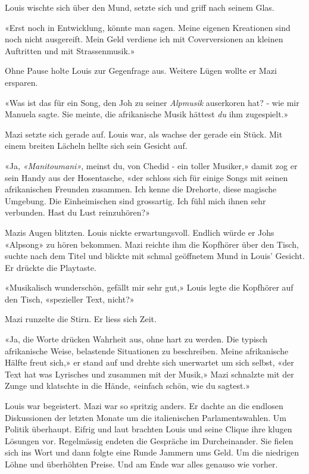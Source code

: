 Louis wischte sich über den Mund, setzte sich und griff nach seinem
Glas.

«Erst noch in Entwicklung, könnte man sagen. Meine eigenen Kreationen
sind noch nicht ausgereift. Mein Geld verdiene ich mit Coverversionen an
kleinen Auftritten und mit Strassenmusik.»

Ohne Pause holte Louis zur Gegenfrage aus. Weitere Lügen wollte er Mazi
ersparen.

«Was ist das für ein Song, den Joh zu seiner \emph{Alpmusik} auserkoren
hat? - wie mir Manuela sagte. Sie meinte, die afrikanische Musik hättest \emph{du} ihm
zugespielt.»

Mazi setzte sich gerade auf. Louis war, als wachse der gerade ein Stück.
Mit einem breiten Lächeln hellte sich sein Gesicht auf.

«Ja, \emph{«Manitoumani»}, meinst du, von Chedid - ein toller
Musiker,» damit zog er sein Handy aus der Hosentasche, «der schloss 
sich für einige Songs mit seinen afrikanischen Freunden zusammen. Ich
kenne die Drehorte, diese magische Umgebung. Die Einheimischen sind
grossartig. Ich fühl mich ihnen sehr verbunden. Hast du Lust
reinzuhören?»

Mazis Augen blitzten.
Louis nickte erwartungsvoll. Endlich würde er Johs «Alpsong» zu hören
bekommen.
Mazi reichte ihm die Kopfhörer über den Tisch, suchte nach dem Titel und
blickte mit schmal geöffnetem Mund in Louis’ Gesicht. Er drückte die
Playtaste.



«Musikalisch wunderschön, gefällt mir sehr gut,» Louis legte die
Kopfhörer auf den Tisch, «spezieller Text, nicht?»

Mazi runzelte die Stirn. Er liess sich
Zeit.

«Ja, die Worte drücken Wahrheit aus, ohne hart zu werden. Die typisch
afrikanische Weise, belastende Situationen zu beschreiben. Meine
afrikanische Hälfte freut sich,» er stand auf und drehte sich unerwartet
um sich selbst, «der Text hat was Lyrisches und zusammen mit der Musik,» Mazi
schnalzte mit der Zunge und klatschte in die Hände, «einfach schön, wie
du sagtest.»

Louis war begeistert. Mazi war so spritzig anders. Er dachte 
an die endlosen Diskussionen der letzten Monate um die italienischen
Parlamentswahlen. Um Politik überhaupt. Eifrig und laut brachten Louis 
und seine Clique ihre klugen Lösungen vor. Regelmässig endeten die
Gespräche im Durcheinander. Sie fielen sich ins Wort und dann folgte
eine Runde Jammern ums Geld. Um die niedrigen Löhne und überhöhten
Preise. Und am Ende war alles genauso wie vorher. 

